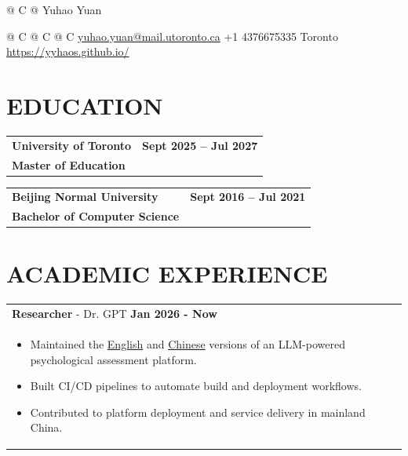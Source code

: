 \documentclass[a4paper,12pt]{article}
\begin{document}
\pagestyle{empty} 

\begin{tabularx}{\linewidth}{@{} C @{}}
\Huge{Yuhao Yuan} \\[6pt]
\end{tabularx}

\begin{tabularx}{\linewidth}{@{} C @{} C @{} C}
{{\href{mailto:yuhao.yuan@mail.utoronto.ca}{\raisebox{-0.05\height}{\faEnvelope} yuhao.yuan@mail.utoronto.ca}}}
{{\raisebox{-0.05\height}{\faMobile} +1 4376675335}} 
{{\raisebox{-0.05\height}{\faMapMarker} Toronto}}
{{\href{https://yyhaos.github.io/}{\raisebox{-0.05\height}{\faGithub} https://yyhaos.github.io/}}}
\end{tabularx}

\hfill
\section{\textbf{EDUCATION}}
\begin{tabularx}{\linewidth}{ @{}X r@{} }
    \textbf{University of Toronto} & \textbf{Sept 2025 -- Jul 2027} \\[4pt]
    \textbf{Master of Education}    \\[4pt]
\end{tabularx}
\begin{tabularx}{\linewidth}{ @{}X r@{} }
    \textbf{Beijing Normal University} & \textbf{Sept 2016 -- Jul 2021} \\[4pt]
    \textbf{Bachelor of Computer Science}\\[4pt]
\end{tabularx}

\hfill\section{\textbf{ACADEMIC EXPERIENCE}}

\begin{tabularx}{\linewidth}{ @{}l r@{} }
    \textbf{Researcher} - Dr. GPT \hfill \textbf{Jan 2026 - Now} \\[4pt]
    \begin{minipage}[t]{\linewidth}
        \begin{itemize}[nosep,after=\strut, leftmargin=1em, itemsep=2pt]
            \item Maintained the \href{https://llm-psych-assessment-demo.onrender.com/}{English} and \href{https://llm-psych-assessment-chinese-demo.onrender.com/}{Chinese} versions of an LLM-powered psychological assessment platform.
            \item Built CI/CD pipelines to automate build and deployment workflows.
            \item Contributed to platform deployment and service delivery in mainland China.
        \end{itemize}
    \end{minipage}
\end{tabularx}
\end{document}
